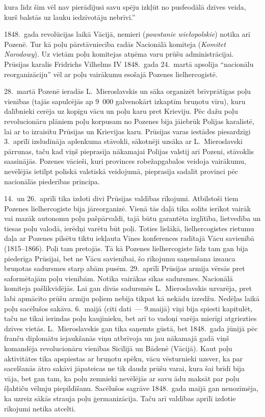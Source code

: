 \documentclass[twoside,a5paper,12pt,fleqn,openany]{extbook}
\newcommand{\pltxti}[1]{\textit{\textpolish{#1}}}
\begin{document}
kura līdz šim vēl nav pierādījusi savu spēju izkļūt no pusfeodālā dzīves veida, kurš balstās uz lauku iedzīvotāju nebrīvi.''

1848.~gada revolūcijas laikā Vācijā, nemieri (\pltxti{powstanie wiełopolskie}) notika arī Pozenē. Tur kā poļu pārstāvniecība radās Nacionālā komiteja (\pltxti{Komitet Narodowy}). Uz vietām poļu komitejas atņēma varu prūšu administrācijai. Prūsijas karalis Fridrichs Vilhelms IV 1848.~gada 24.~martā apsolīja ``nacionālu reorganizāciju'' vēl ar poļu vairākumu esošajā Pozenes lielhercogistē.

28.~martā Pozenē ieradās L.~Mieroslavskis un sāka organizēt brīvprātīgas poļu vienības (tajās sapulcējās ap 9~000 galvenokārt izkaptīm bruņotu vīru), kuru dalībnieki cerēja uz kopīgu vācu un poļu karu pret Krieviju. Pēc dažu poļu revolucionāru plāniem poļu korpusam no Pozenes bija jāiebrūk Polijas karalistē, lai ar to izraisītu Prūsijas un Krievijas karu. Prūsijas varas iestādes piesardzīgi 3.~aprīlī izsludināja aplenkuma stāvokli, sākotnēji uzsāka ar L.~Mieroslavski pārrunas, taču kad viņš pieprasīja nākamajai Polijas valstij arī Pozeni, stāvoklis saasinājās. Pozenes vācieši, kuri provinces robežapgabalos veidoja vairākumu, nevēlējās ietilpt poliskā valstiskā veidojumā, pieprasīja sadalīt provinci pēc nacionālās piederības principa.

14.~un 26.~aprīlī tika izdoti divi Prūsijas valdības rīkojumi. Atbilstoši tiem Pozenes lielhercogiste bija jāreorganizē. Vienā tās daļā tika solīts ierīkot vairāk vai mazāk autonomu poļu pašpārvaldi, tajā būtu garantēta izglītība, lietvedība un tiesas poļu valodā, ierēdņi varētu būt poļi. Toties lielākā, lielhercogistes rietumu daļa ar Pozenes pilsētu tiktu iekļauta Vīnes konferences radītajā Vācu savienībā (1815--1866). Poļi tam pretojās. Tā kā Pozenes lielhercogiste līdz tam gan bija piederīga Prūsijai, bet ne Vācu savienībai, šo rīkojumu saņemšana izsauca bruņotas sadursmes starp abām pusēm. 29.~aprīlī Prūsijas armija vērsās pret saformētajām poļu vienībām. Notika vairākas sīkas sadursmes. Nacionālā komiteja pašlikvidējās. Lai gan divās sadursmēs L.~Mieroslavskis uzvarēja, pret labi apmācīto prūšu armiju poļiem nebija tikpat kā nekādu izredžu. Nedēļas laikā poļu sacēlušos sakāva. 6.~maijā (citi dati~--- 9.maijā) viņi bija spiesti kapitulēt, taču ne tikai ierindas poļu kaujinieku, bet arī to vadoņi varēja mierīgi atgriezties dzīves vietās. L.~Mieroslavskis gan tika saņemts gūstā, bet 1848.~gada jūnijā pēc franču diplomātu iejaukšanās viņu atbrīvoja un jau nākamajā gadā viņš komandēja revolucionāru vienības Sicīlijā un Bādenē (Vācijā). Kaut poļu aktivitātes tika apspiestas ar bruņotu spēku, vācu vēsturnieki uzsver, ka par sacelšanās ātro sakāvi jāpateicas ne tik daudz prūšu varai, kura šai brīdī bija vāja, bet gan tam, ka poļu zemnieki nevēlējās ar savu ādu maksāt par poļu šļahtiču vēlmju piepildīšanu. Sacēlušos sagrāve 1848.~gada maijā gan nenozīmēja, ka uzreiz sākās strauja poļu ģermanizācija. Taču arī valdības aprīlī izdotie rīkojumi netika atcelti.
\end{document}
